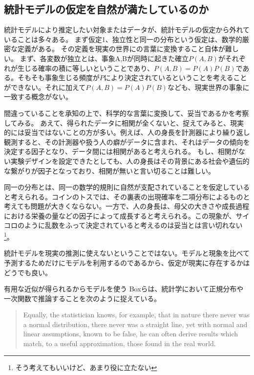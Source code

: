\subsection{統計モデルの仮定を自然が満たしているのか}
統計モデルにより推定したい対象またはデータが、統計モデルの仮定から外れていることは多々ある。
まず仮定1、独立性と同一の分布という仮定は、数学的厳密な定義がある。
その定義を現実の世界にの言葉に変換すること自体が難しい。
まず、各変数が独立とは、事象A,Bが同時に起きた確立$P(A,B)$がそれぞれが生じる確率の積に等しいということであり、$P(A,B)=P(A)P(B)$である。そもそも事象生じる頻度が$P$により決定されているということを考えることができない。それに加えて$P(A,B)=P(A)P(B)$なども、現実世界の事象に一致する概念がない。

間違っていることを承知の上で、科学的な言葉に変換して、妥当であるかを考察してみる。
あえて、得られたデータに相関が全くないと、捉えてみると、現実的には妥当ではないことの方が多い。例えば、人の身長を計測器により繰り返し観測すると、その計測器や扱う人の癖がデータに含まれ、それはデータの傾向を決定する因子となり、データ間には相関があると考えられる。
もし、相関がない実験デザインを設定できたとしても、人の身長はその背景にある社会や遺伝的な繋がりが因子となっており、相関が無いと言い切ることは難しい。

同一の分布とは、同一の数学的規則に自然が支配されていることを仮定していると考えられる。コインのトスでは、その裏表の出現確率を二項分布によるものと考えても問題が大きくならない。一方で、人の身長は、母父の大きさや成長過程における栄養の量などの因子によって成長すると考えられる。この現象が、サイコロのように乱数をふって決定されていると考えるのは妥当とは言い切れない\footnote{そう考えてもいいけど、あまり役に立たない}。


統計モデルを現実の推測に使えないということではない。モデルと現象を比べて予測するためだけにモデルを利用するのであるから、仮定が現実に存在するかはどうでも良い。
\begin{SMbox}{有用な近似が得られるからモデルを使う}
    Boxらは、統計学において正規分布や一次関数で推論することを次のように捉えている\cite{box1976science}。
\begin{quote}
    Equally, the statistician knows, for example, that in nature there never was a normal distribution, there never was a straight line, yet with normal and linear assumptions, known to be false, he can often derive results which match, to a useful approximation, those found in the real world. 
\end{quote}
\end{SMbox}

